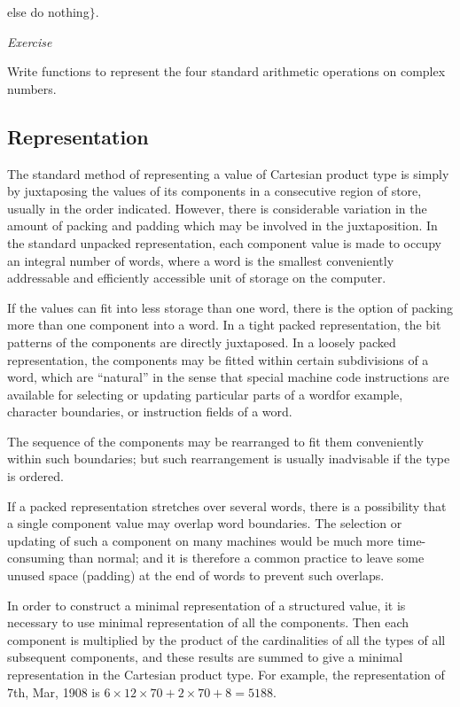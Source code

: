 \quad \quad \quad else do nothing$\}$.

\noindent
\textit{Exercise}
\nopagebreak

\noindent
Write functions to represent the four standard arithmetic operations on complex numbers.

\subsection{Representation}
\label{sec:representation-4-2}

The standard method of representing a value of Cartesian product type is simply by juxtaposing the values of its components in a consecutive region of store, usually in the order indicated. However, there is considerable variation in the amount of packing and padding which may be involved in the juxtaposition. In the standard unpacked representation, each component value is made to occupy an integral number of words, where a word is the smallest conveniently addressable and efficiently accessible unit of storage on the computer.

If the values can fit into less storage than one word, there is the option of packing more than one component into a word. In a tight packed representation, the bit patterns of the components are directly juxtaposed. In a loosely packed representation, the components may be fitted within certain subdivisions of a word, which are ``natural'' in the sense that special machine code instructions are available for selecting or updating particular parts of a word\textemdash{}for example, character boundaries, or instruction fields of a word.

The sequence of the components may be rearranged to fit them conveniently within such boundaries; but such rearrangement is usually inadvisable if the type is ordered.

If a packed representation stretches over several words, there is a possibility that a single component value may overlap word boundaries. The selection or updating of such a component on many machines would be much more time-consuming than normal; and it is therefore a common practice to leave some unused space (padding) at the end of words to prevent such overlaps.

In order to construct a minimal representation of a structured value, it is necessary to use minimal representation of all the components. Then each component is multiplied by the product of the cardinalities of all the types of all subsequent components, and these results are summed to give a minimal representation in the Cartesian product type. For example, the representation of 7th, Mar, 1908 is $6\times 12\times 70 + 2\times 70 + 8 = 5188$.

